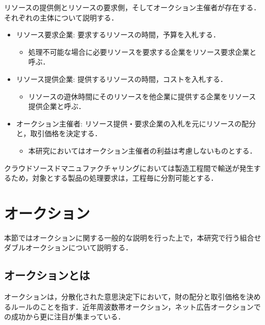 リソースの提供側とリソースの要求側，そしてオークション主催者が存在する．それぞれの主体について説明する．

\begin{itemize}
\tightlist
\item
  リソース要求企業: 要求するリソースの時間，予算を入札する．

  \begin{itemize}
  \tightlist
  \item
    処理不可能な場合に必要リソースを要求する企業をリソース要求企業と呼ぶ．
  \end{itemize}
\item
  リソース提供企業: 提供するリソースの時間，コストを入札する．

  \begin{itemize}
  \tightlist
  \item
    リソースの遊休時間にそのリソースを他企業に提供する企業をリソース提供企業と呼ぶ．
  \end{itemize}
\item
  オークション主催者:
  リソース提供・要求企業の入札を元にリソースの配分と，取引価格を決定する．

  \begin{itemize}
  \tightlist
  \item
    本研究においてはオークション主催者の利益は考慮しないものとする．
  \end{itemize}
\end{itemize}

クラウドソースドマニュファクチャリングにおいては製造工程間で輸送が発生するため，対象とする製品の処理要求は，工程毎に分割可能とする．

\hypertarget{ux30aaux30fcux30afux30b7ux30e7ux30f3}{%
\section{オークション}\label{ux30aaux30fcux30afux30b7ux30e7ux30f3}}

本節ではオークションに関する一般的な説明を行った上で，本研究で行う組合せダブルオークションについて説明する．

\hypertarget{ux30aaux30fcux30afux30b7ux30e7ux30f3ux3068ux306f}{%
\subsection{オークションとは}\label{ux30aaux30fcux30afux30b7ux30e7ux30f3ux3068ux306f}}

オークションは，分散化された意思決定下において，財の配分と取引価格を決めるルールのことを指す\cite{market}．近年周波数帯オークション，ネット広告オークションでの成功から更に注目が集まっている\cite{yokoo}．

